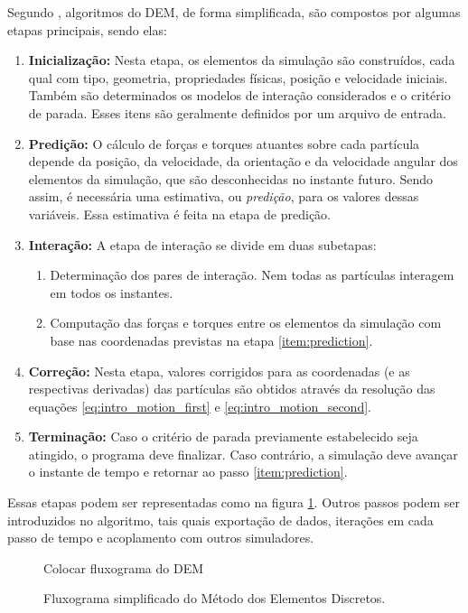Segundo , algoritmos do DEM, de forma simplificada, são compostos por algumas etapas principais, sendo elas:
\begin{enumerate}
	\item \textbf{Inicialização:} Nesta etapa, os elementos da simulação são construídos, cada qual com tipo, geometria, propriedades físicas, posição e velocidade iniciais. Também são determinados os modelos de interação considerados e o critério de parada. Esses itens são geralmente definidos por um arquivo de entrada.
	\item \textbf{Predição:} O cálculo de forças e torques atuantes sobre cada partícula depende da posição, da velocidade, da orientação e da velocidade angular dos elementos da simulação, que são desconhecidas no instante futuro. Sendo assim, é necessária uma estimativa, ou \textit{predição}, para os valores dessas variáveis. Essa estimativa é feita na etapa de predição. \label{item:prediction}
	\item \textbf{Interação:} A etapa de interação se divide em duas subetapas:
		\begin{enumerate}
			\item Determinação dos pares de interação. Nem todas as partículas interagem em todos os instantes.
			\item Computação das forças e torques entre os elementos da simulação com base nas coordenadas previstas na etapa \ref{item:prediction}.
		\end{enumerate}
	\item \textbf{Correção:} Nesta etapa, valores corrigidos para as coordenadas (e as respectivas derivadas) das partículas são obtidos através da resolução das equações \eqref{eq:intro_motion_first} e \eqref{eq:intro_motion_second}.
	\item \textbf{Terminação:} Caso o critério de parada previamente estabelecido seja atingido, o programa deve finalizar. Caso contrário, a simulação deve avançar o instante de tempo e retornar ao passo \ref{item:prediction}.
\end{enumerate}

Essas etapas podem ser representadas como na figura \ref{fig:simple_dem_algorithm}. Outros passos podem ser introduzidos no algoritmo, tais quais exportação de dados, iterações em cada passo de tempo e acoplamento com outros simuladores.

\begin{figure}[h]
	\caption{Fluxograma simplificado do Método dos Elementos Discretos.}
	\begin{center}
		\alert{Colocar fluxograma do DEM}
	\end{center}
	\label{fig:simple_dem_algorithm}
\end{figure}


